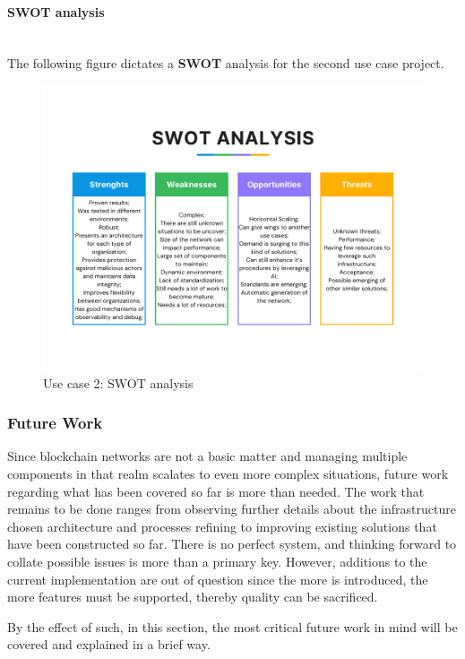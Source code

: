 \paragraph{SWOT analysis}\mbox{}\\

The following figure dictates a \textbf{SWOT} analysis for the second use case project.

\begin{figure}[H]
	\centering
	\includegraphics[width=0.9\linewidth]{assets/use-case-2/SWOT-use-case-2}
	\caption{Use case 2: SWOT analysis}
	\label{fig:swot-use-case-2}
\end{figure}


\subsubsection{Future Work}
Since blockchain networks are not a basic matter and managing multiple components in that realm scalates to even more complex situations, future work regarding what has been covered so far is more than needed. The work that remains to be done ranges from observing further details about the infrastructure chosen architecture and processes refining to improving existing solutions that have been constructed so far. There is no perfect system, and thinking forward to collate possible issues is more than a primary key. However, additions to the current implementation are out of question since the more is introduced, the more features must be supported, thereby quality can be sacrificed.

By the effect of such, in this section, the most critical future work in mind will be covered and explained in a brief way.

